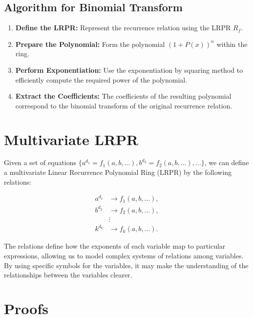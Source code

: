 \documentclass{article}
\theoremstyle{plain}
\begin{document}
\subsection{Algorithm for Binomial Transform}
\begin{enumerate}
    \item \textbf{Define the LRPR:} Represent the recurrence relation using the LRPR \( R_f \).
    \item \textbf{Prepare the Polynomial:} Form the polynomial \( (1 + P(x))^n \) within the ring.
    \item \textbf{Perform Exponentiation:} Use the exponentiation by squaring method to efficiently compute the required power of the polynomial.
    \item \textbf{Extract the Coefficients:} The coefficients of the resulting polynomial correspond to the binomial transform of the original recurrence relation.
\end{enumerate}

\section{Multivariate LRPR}
Given a set of equations \(\{a^{d_1} = f_1(a, b, \ldots), b^{d_2} = f_2(a, b, \ldots), \ldots\}\), we can define a multivariate Linear Recurrence Polynomial Ring (LRPR) by the following relations:

\begin{align*}
a^{d_1} &\rightarrow f_1(a, b, \ldots), \\
b^{d_2} &\rightarrow f_2(a, b, \ldots), \\
&\vdots \\
k^{d_k} &\rightarrow f_k(a, b, \ldots).
\end{align*}

The relations define how the exponents of each variable map to particular expressions, allowing us to model complex systems of relations among variables. By using specific symbols for the variables, it may make the understanding of the relationships between the variables clearer.

\section{Proofs}
\end{document}
